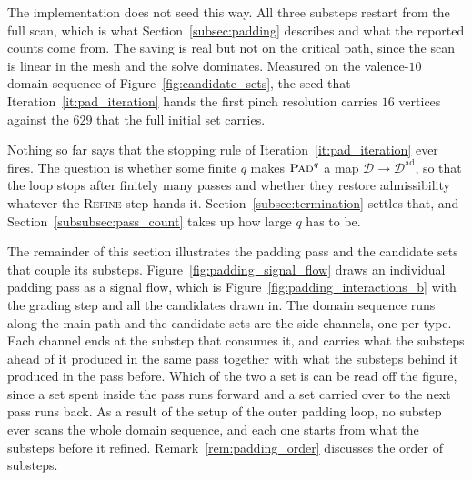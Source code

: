 \documentclass[a4paper, 12pt]{article}
\newcommand{\robert}[1]{{\color{orange} #1}}
\newcommand{\allpartitions}{\mathscr{C}^{\mathrm{sp}}}
\theoremstyle{definition}
\theoremstyle{plain}
\numberwithin{equation}{section}
\newcommand{\tobecut}[1]{{\color{red} #1}}     %
\newcommand{\alldomseqs}{\mathscr{D}}
\renewcommand{\allpartitions}{\mathscr{D}^{\mathrm{ad}}}
\begin{document}
\robert{The implementation does not seed this way. All three substeps restart from the full scan, which is what Section~\ref{subsec:padding} describes and what the reported counts come from. The saving is real but not on the critical path, since the scan is linear in the mesh and the solve dominates. Measured on the valence-$10$ domain sequence of Figure~\ref{fig:candidate_sets}, the seed that Iteration~\ref{it:pad_iteration} hands the first pinch resolution carries $16$ vertices against the $629$ that the full initial set carries.}

Nothing so far says that the stopping rule of Iteration~\ref{it:pad_iteration} ever fires. The question is whether \tobecut{some finite $q$ makes $\textsc{Pad}^{q}$ a map $\alldomseqs \to \allpartitions$, so that}\robert{the loop stops after} finitely many passes \robert{and whether they} restore admissibility whatever the \textsc{Refine} step hands it. Section~\ref{subsec:termination} settles that, and Section~\ref{subsubsec:pass_count} takes up how large $q$ has to be.

\smallskip

The remainder of this section illustrates the padding pass and the candidate sets that couple its substeps. Figure~\ref{fig:padding_signal_flow} draws an individual padding pass as a signal flow, which is Figure~\ref{fig:padding_interactions_b} with the grading step and all the candidates drawn in. The domain sequence runs along the main path and the candidate sets are the side channels, one per type. Each channel ends at the substep that consumes it, and carries what the substeps ahead of it produced in the same pass together with what the substeps behind it produced in the pass before. Which of the two a set is can be read off the figure, since a set spent inside the pass runs forward and a set carried over to the next pass runs back. As a result of the setup of the outer padding loop, no substep ever scans the whole domain sequence, and each one starts from what the substeps before it refined. Remark~\ref{rem:padding_order} discusses the order of substeps.
\end{document}
